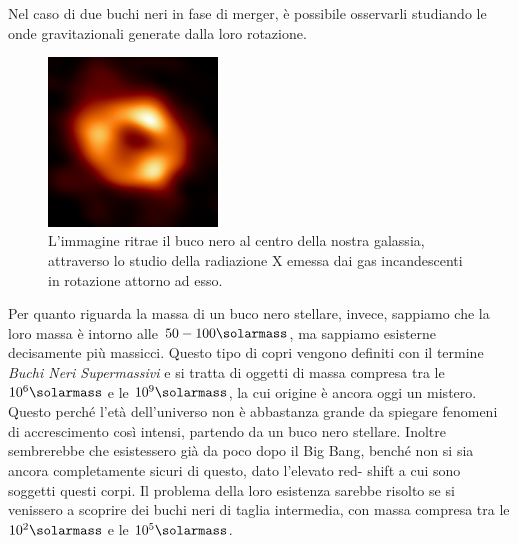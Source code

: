 Nel caso di due buchi neri in fase di merger, è possibile osservarli studiando le onde gravitazionali generate dalla loro rotazione.
\begin{figure}
    \centering
    \includegraphics[width=0.4\textwidth]{immagini/blackhole.png}
    \caption{L'immagine ritrae il buco nero al centro della nostra galassia, attraverso lo studio della radiazione X emessa dai gas incandescenti in rotazione attorno ad esso.}\label{fig:buco-nero}
\end{figure}

Per quanto riguarda la massa di un buco nero stellare, invece, sappiamo che la loro massa è intorno alle $50 - 100\si{\solarmass}$, ma sappiamo esisterne decisamente più massicci. Questo tipo di copri vengono definiti con il termine \textit{Buchi Neri Supermassivi} e si tratta di oggetti di massa compresa tra le $10^6 \si{\solarmass}$ e le $10^9 \si{\solarmass}$, la cui origine è ancora oggi un mistero. Questo perché l'età dell'universo non è abbastanza grande da spiegare fenomeni di accrescimento così intensi, partendo da un buco nero stellare. Inoltre sembrerebbe che esistessero già da poco dopo il Big Bang, benché non si sia ancora completamente sicuri di questo, dato l'elevato red- shift a cui sono soggetti questi corpi. Il problema della loro esistenza sarebbe risolto se si venissero a scoprire dei buchi neri di taglia intermedia, con massa compresa tra le $10^2 \si{\solarmass}$ e le $10^5 \si{\solarmass}$.